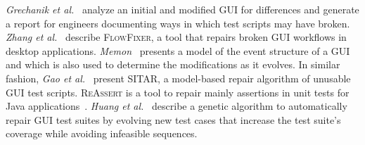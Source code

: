 \textit{Grechanik et al.}~\cite{Grechanik:2009:MEG:1555001.1555055} analyze an initial and modified GUI for differences and generate a report for engineers documenting ways in which test scripts may have broken.
\textit{Zhang et al.}~\cite{Zhang:2013:ARB:2483760.2483775} describe \textsc{FlowFixer}, a tool that repairs broken GUI workflows in desktop applications. 
\textit{Memon}~\cite{Memon:2008:ARE:1416563.1416564} presents a model of the event structure of a GUI and which is also used to determine the modifications as it evolves. 
In similar fashion, \textit{Gao et al.}~\cite{Gao:2016:SGT:3046547.3046580} present \textsc{SITAR}, a model-based repair algorithm of unusable GUI test scripts. 
\textsc{ReAssert} is a tool to repair mainly assertions in unit tests for Java applications~\cite{Daniel:2011:AGR:2002931.2002937,Daniel:2011:RTR:1985793.1985978,Daniel:2009:RSR:1747491.1747538,Daniel:2010:TRU:1831708.1831734}. 
\textit{Huang et al.}~\cite{Huang:2010:RGT:1828417.1828465} describe a genetic algorithm to automatically repair GUI test suites by evolving new test cases that increase the test suite's coverage while avoiding infeasible sequences.

